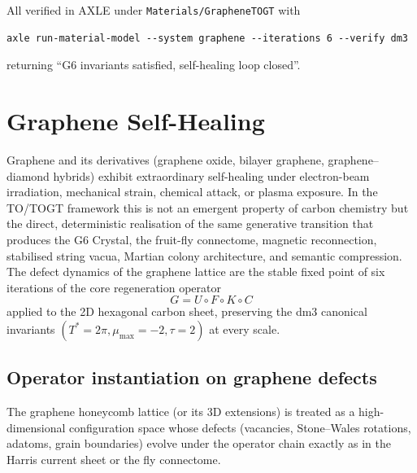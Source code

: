 \documentclass[19pt]{book}
\theoremstyle{plain}
\theoremstyle{definition}
\theoremstyle{remark}
\begin{document}

All verified in AXLE under \texttt{Materials/GrapheneTOGT} with
\begin{verbatim}
axle run-material-model --system graphene --iterations 6 --verify dm3
\end{verbatim}
returning “G6 invariants satisfied, self-healing loop closed”.
\bigskip
\chapter{Graphene Self-Healing}

Graphene and its derivatives (graphene oxide, bilayer graphene, graphene–diamond hybrids) exhibit extraordinary self-healing under electron-beam irradiation, mechanical strain, chemical attack, or plasma exposure. In the TO/TOGT framework this is not an emergent property of carbon chemistry but the direct, deterministic realisation of the same generative transition that produces the G6 Crystal, the fruit-fly connectome, magnetic reconnection, stabilised string vacua, Martian colony architecture, and semantic compression. The defect dynamics of the graphene lattice are the stable fixed point of six iterations of the core regeneration operator
\[
G = U \circ F \circ K \circ C
\]
applied to the 2D hexagonal carbon sheet, preserving the dm3 canonical invariants \((T^* = 2\pi, \mu_{\max} = -2, \tau = 2)\) at every scale.

\section{Operator instantiation on graphene defects}

The graphene honeycomb lattice (or its 3D extensions) is treated as a high-dimensional configuration space whose defects (vacancies, Stone–Wales rotations, adatoms, grain boundaries) evolve under the operator chain exactly as in the Harris current sheet or the fly connectome.
\end{document}
